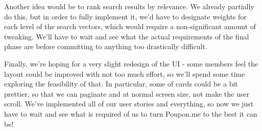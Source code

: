 \documentclass{scrartcl}
\begin{document}
    Another idea would be to rank search results by relevance.
    We already partially do this, but in order to fully implement it, we'd have to designate weights for each level of the search vectors, which would require a non-significant amount of tweaking.
    We'll have to wait and see what the actual requirements of the final phase are before committing to anything too drastically difficult.

    Finally, we're hoping for a very slight redesign of the UI - some members feel the layout could be improved with not too much effort, so we'll spend some time exploring the feasibility of that.
    In particular, some of cards could be a bit prettier, so that we can paginate and at normal screen size, not make the user scroll.
    We've implemented all of our user stories and everything, so now we just have to wait and see what is required of us to turn Poupon.me to the best it can be!
\end{document}
